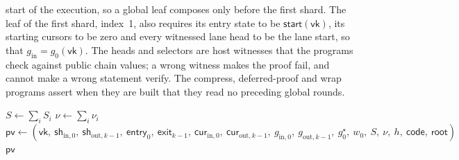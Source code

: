 start of the execution, so a global leaf composes only before the first shard. The leaf of the first shard, index~1, also requires its entry state to be $\mathsf{start}(\mathsf{vk})$, its starting cursors to be zero and every witnessed lane head to be the lane start, so that $g_{\mathrm{in}} = g_0(\mathsf{vk})$. The heads and selectors are host witnesses that the programs check against public chain values; a wrong witness makes the proof fail, and cannot make a wrong statement verify. The compress, deferred-proof and wrap programs assert when they are built that they read no preceding global rounds.

\begin{algorithm}[t]
\caption{The compose node of arity $k$, and what the root additionally
requires. Line~2 is the binding of \S\ref{sec:security-binding}: without it the node
would verify \emph{some} proof rather than a proof of this machine.}
\label{alg:compose}
\DontPrintSemicolon
{}
$S \gets \sum_{i} S_i$ 
$\nu \gets \sum_{i} \nu_i$\;
$\mathsf{pv} \gets (\mathsf{vk},\ \mathsf{sh}_{\mathrm{in},0},\ \mathsf{sh}_{\mathrm{out},k-1},\ \mathsf{entry}_0,\ \mathsf{exit}_{k-1},\
  \mathsf{cur}_{\mathrm{in},0},\ \mathsf{cur}_{\mathrm{out},k-1},\ g_{\mathrm{in},0},\ g_{\mathrm{out},k-1},\ g^\star_0,\ w_0,\ S,\ \nu,\ h,\ \mathsf{code},\ \mathsf{root})$\;
\Return $\mathsf{pv}$\;
\end{algorithm}

